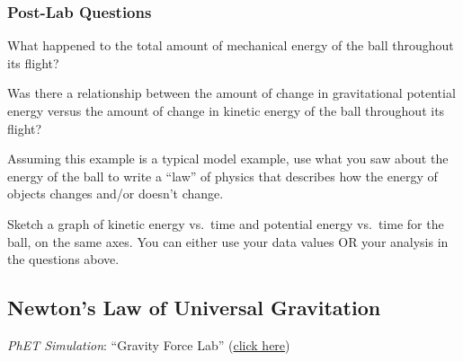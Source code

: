 \documentclass{article}
\begin{document}
\subsubsection*{Post-Lab Questions}

\begin{exercise}
    What happened to the total amount of mechanical energy of the ball throughout its flight?
\end{exercise}

\begin{exercise}
    Was there a relationship between the amount of change in gravitational potential energy versus the amount of change in kinetic energy of the ball throughout its flight?
\end{exercise}

\begin{exercise}
    Assuming this example is a typical model example, use what you saw about the energy of the ball to write a ``law'' of physics that describes how the energy of objects changes and/or doesn't change. 
\end{exercise}

\begin{exercise}
    Sketch a graph of kinetic energy vs.~time and potential energy vs.~time for the ball, on the same axes. You can either use your data values OR your analysis in the questions above.
\end{exercise}



\subsection{Newton's Law of Universal Gravitation}

 \textit{PhET Simulation}: ``Gravity Force Lab'' (\href{https://phet.colorado.edu/sims/html/gravity-force-lab/latest/gravity-force-lab_en.html}{click here})
\end{document}
